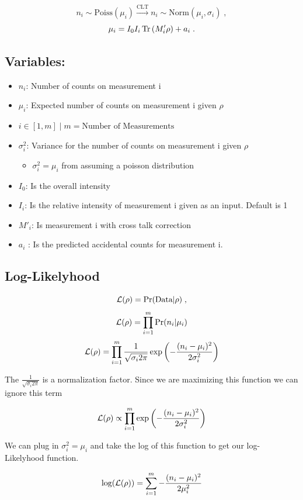 \documentclass{article}
\begin{document}
$$n_i \sim \text{Poiss}(\mu_{i}) \xrightarrow{\text{CLT}}
       n_i \sim \text{Norm}(\mu_{i},\sigma_i) \;,$$
$$\mu_{i} = I_0 I_i \operatorname{Tr}\left( M'_i \rho \right) + a_i \;.$$

\subsection{Variables: }
\begin{itemize}
\item $n_i$: Number of counts on measurement i
\item $\mu_i$: Expected number of counts on measurement i given $\rho$
\item $i \in[1,m] \; \big| \; m = \text{Number of Measurements}$
\item $\sigma_i^2$: Variance for the number of counts on measurement i given $\rho$
\begin{itemize}
    \item $\sigma_i^2 = \mu_i$ from assuming a poisson distribution
\end{itemize}
\item $I_0$: Is the overall intensity
\item $I_i$: Is the relative intensity of measurement i given as an input. Default is 1
\item $M'_i$: Is measurement i with cross talk correction
\item $a_i$ : Is the predicted accidental counts for measurement i.
\end{itemize}

\subsection{Log-Likelyhood}
$$\mathcal{L}(\rho) = \text{Pr}(\text{Data}|\rho) \;,$$
$$\mathcal{L}(\rho) = \prod_{i=1}^m \text{Pr}(n_i|\mu_i)$$
$$\mathcal{L}(\rho) = \prod_{i=1}^m \frac{1}{\sqrt{\sigma_i2\pi}}
                \exp\left( -\frac{(n_i-\mu_i)^2}{2\sigma_i^2} \right)$$

The $\frac{1}{\sqrt{\sigma_i2\pi}}$ is a normalization factor. Since we are maximizing this
function we can ignore this term

$$\mathcal{L}(\rho) \propto \prod_{i=1}^m \exp\left( -\frac{(n_i-\mu_i)^2}{2\sigma_i^2} \right)$$

We can plug in $\sigma_i^2 = \mu_i$ and take the log of this function to get our log-Likelyhood function.

$$\text{log}(\mathcal{L}(\rho)) = \sum_{i=1}^m -\frac{(n_i-\mu_i)^2}{2\mu_i^2}$$
\end{document}
